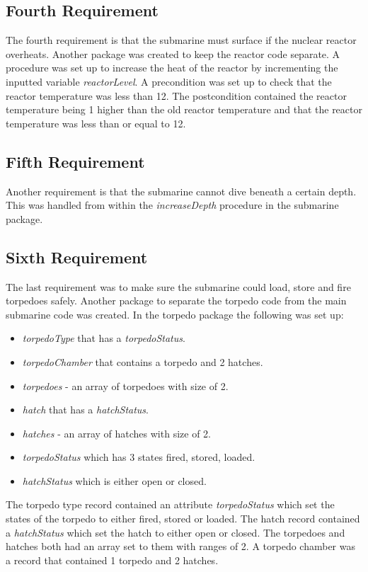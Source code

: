 \subsection{Fourth Requirement}
The fourth requirement is that the submarine must surface if the nuclear reactor overheats. Another package was created to keep the reactor code separate. A procedure was set up to increase the heat of the reactor by incrementing the inputted variable \textit{reactorLevel}. A precondition was set up to check that the reactor temperature was less than 12. The postcondition contained the reactor temperature being 1 higher than the old reactor temperature and that the reactor temperature was less than or equal to 12.

\subsection{Fifth Requirement}
Another requirement is that the submarine cannot dive beneath a certain depth. This was handled from within the \textit{increaseDepth} procedure in the submarine package.

\subsection{Sixth Requirement}
The last requirement was to make sure the submarine could load, store and fire torpedoes safely. Another package to separate the torpedo code from the main submarine code was created. In the torpedo package the following was set up: \begin{itemize}
	\item \textit{torpedoType} that has a \textit{torpedoStatus}. 
	\item \textit{torpedoChamber} that contains a torpedo and 2 hatches.
	\item \textit{torpedoes} - an array of torpedoes with size of 2.
	\item \textit{hatch} that has a \textit{hatchStatus}.
	\item \textit{hatches} - an array of hatches with size of 2.
	\item \textit{torpedoStatus} which has 3 states fired, stored, loaded.
	\item \textit{hatchStatus} which is either open or closed.
\end{itemize}

The torpedo type record contained an attribute \textit{torpedoStatus} which set the states of the torpedo to either fired, stored or loaded. The hatch record contained a \textit{hatchStatus} which set the hatch to either open or closed. The torpedoes and hatches both had an array set to them with ranges of 2. A torpedo chamber was a record that contained 1 torpedo and 2 hatches.

